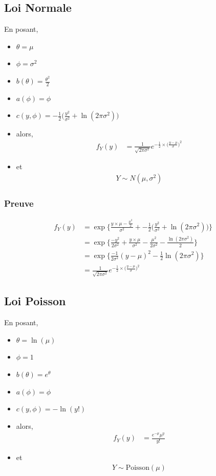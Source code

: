 \documentclass[11pt,french]{report}
\newcommand{\fact}[1]{#1\mathpunct{}!}
\begin{document}
\subsection{Loi Normale}
En posant,
\begin{itemize}
     \item $\theta = \mu$
     \item $\phi = \sigma^2$
     \item $b(\theta) = \frac{\theta^2}{2}$
     \item $a(\phi) = \phi$
     \item $c(y, \phi) = -\frac{1}{2}\bigg(\frac{y^2}{\sigma^2} + \ln(2 \pi \sigma^2) \bigg)$
     \item[] alors,
     \begin{align*}
          f_Y(y) &= \frac{1}{\sqrt{2 \pi \sigma^2}}e^{-\frac{1}{2}\times \big(\frac{y - \mu}{\sigma} \big)^2}
     \end{align*}
     \item[] et
     \begin{align*}
          Y \sim N(\mu, \sigma^2)
     \end{align*}
\end{itemize}

\subsubsection*{Preuve}
\begin{align*}
f_Y(y) &= \exp\Bigg\lbrace \frac{y \times \mu - \frac{\mu^2}{2}}{\sigma^2} + -\frac{1}{2} \bigg( \frac{y^2}{\sigma^2} + \ln(2 \pi \sigma^2) \bigg) \Bigg\rbrace \\
&= \exp\Bigg\lbrace \frac{-y^2}{2\sigma^2} + \frac{y \times \mu}{\sigma^2} - \frac{\mu^2}{2\sigma^2} - \frac{\ln(2 \pi \sigma^2)}{2} \Bigg\rbrace \\
&= \exp\Bigg\lbrace \frac{-1}{2\sigma^2}(y - \mu)^2 - \frac{1}{2} \ln(2\pi \sigma^2)\Bigg\rbrace \\
&= \frac{1}{\sqrt{2 \pi \sigma^2}}e^{-\frac{1}{2}\times \big(\frac{y - \mu}{\sigma} \big)^2}
\end{align*}

\subsection{Loi Poisson}
En posant,
\begin{itemize}
     \item $\theta = \ln(\mu)$
     \item $\phi = 1$
     \item $b(\theta) = e^{\theta}$
     \item $a(\phi) = \phi$
     \item $c(y, \phi) = -\ln(\fact{y})$
     \item[] alors,
     \begin{align*}
          f_Y(y) &= \frac{e^{-\mu}\mu^y}{\fact{y}}
     \end{align*}
     \item[] et
     \begin{align*}
          Y \sim \text{Poisson}(\mu)
     \end{align*}
\end{itemize}
\end{document}
